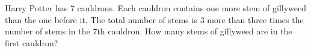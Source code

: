 Harry Potter has $7$ cauldrons. Each cauldron contains one more stem of gillyweed than the one before it. The total number of stems is $3$ more than three times the number of stems in the $7$th cauldron. How many stems of gillyweed are in the first cauldron?
